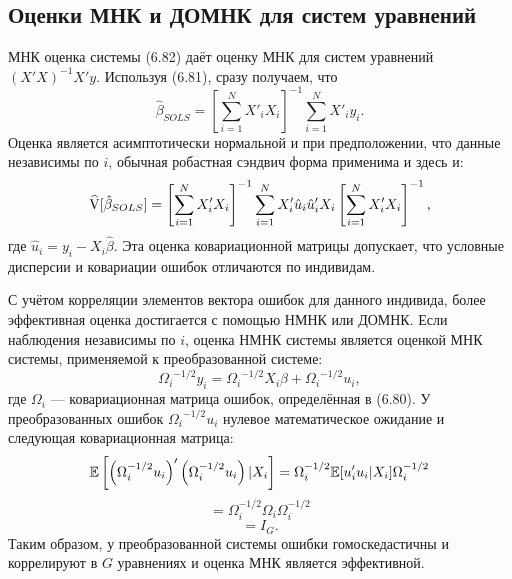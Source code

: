 \subsection{Оценки МНК и ДОМНК для систем уравнений}

МНК оценка системы (6.82) даёт оценку МНК для систем уравнений $(X'X)^{-1}X'y$. Используя (6.81), сразу получаем, что
\begin{equation}
\hat{\beta}_{SOLS}= \left[ \sum_{i=1}^N X'_i X_i \right]^{-1} \sum_{i=1}^N X'_i y_i.
\end{equation}
Оценка является асимптотически нормальной и при предположении, что данные независимы по $i$, обычная робастная сэндвич форма применима и здесь и:
\begin{equation}
\widehat{\mathrm{V}}[\hat{\beta}_{SOLS}]= \left[ \sum_{i=1}^N X'_i X_i \right]^{-1} \sum_{i=1}^N X'_i \hat{u}_i \hat{u}'_i X_i \left[ \sum_{i=1}^N X'_i X_i \right]^{-1},
\end{equation}
где $\hat{u}_i=y_i-X_i \hat{\beta}$. Эта оценка ковариационной матрицы допускает, что условные дисперсии и ковариации ошибок отличаются по индивидам.

С учётом корреляции элементов вектора ошибок для данного индивида, более эффективная оценка достигается с помощью НМНК или ДОМНК. Если наблюдения независимы по $i$, оценка НМНК системы является оценкой МНК системы, применяемой к преобразованной системе:
\begin{equation}
{\Omega_i}^{-1/2} y_i ={\Omega_i}^{-1/2} X_i \beta + {\Omega_i}^{-1/2}u_i,
\end{equation}
где $\Omega_i$ --- ковариационная матрица ошибок, определённая в (6.80). У преобразованных ошибок ${\Omega_i}^{-1/2}u_i$ нулевое математическое ожидание и следующая ковариационная матрица:
\[
\mathbb{E} \left[ \left( \Omega^{-1/2}_i u_i \right)' \left( \Omega^{-1/2}_i u_i \right) |X_i \right]= \Omega^{-1/2}_i \mathbb{E}[u'_i u_i|X_i] \Omega^{-1/2}_i
\]
\[
= \Omega^{-1/2}_i \Omega_i \Omega^{-1/2}_i
\]
\[
=I_G.
\]
Таким образом, у преобразованной системы ошибки гомоскедастичны и коррелируют в $G$ уравнениях и оценка МНК является эффективной.

